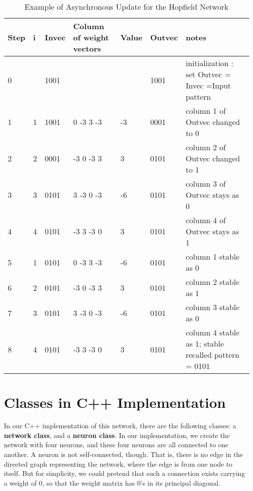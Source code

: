 \begin{center}
\begin{table}
\caption{Example of Asynchronous Update for the Hopfield Network}
\label{tab:example_of_asynchronous_update_for_the_hopfield_network}
\begin{tabular}{|l|l|l|p{3cm}|l|l|p{3cm}|}
\hline
Step & i & Invec & Column of weight vectors & Value & Outvec & notes \\
\hline
0    &   & 1001  &                          &       & 1001   & initialization : set Outvec = Invec =Input pattern\\
\hline
1    & 1 & 1001  & 0 -3 3 -3                & -3    & 0001   & column 1 of Outvec
changed to 0\\
\hline
2    & 2 & 0001  & -3 0 -3 3                &  3    & 0101   & column 2 of Outvec
changed to 1\\
\hline
3    & 3 & 0101  & 3 -3 0 -3                & -6    & 0101   & column 3 of Outvec
stays as 0\\
\hline
4    & 4 & 0101  & -3 3 -3 0                &  3    & 0101   & column 4 of Outvec
stays as 1\\
\hline
5    & 1 & 0101  & 0 -3 3 -3                & -6    & 0101   & column 1 stable as 0\\
\hline
6    & 2 & 0101  & -3 0 -3 3                &  3    & 0101   & column 2 stable as 1\\
\hline
7    & 3 & 0101  & 3 -3 0 -3                & -6    & 0101   & column 3 stable as 0\\
\hline
8    & 4 & 0101  & -3 3 -3 0                &  3    & 0101   & column 4 stable as
1; stable recalled pattern = 0101\\
\hline
\end{tabular}
\end{table}
\end{center}

\section{Classes in C++ Implementation}
In our C++ implementation of this network, there are the following classes: a
\textbf{network class}, and a \textbf{neuron class}. In our implementation, we create the
network with four neurons, and these four neurons are all connected to one
another. A neuron is not self-connected, though. That is, there is no edge in the
directed graph representing the network, where the edge is from one node to
itself. But for simplicity, we could pretend that such a connection exists
carrying a weight of 0, so that the weight matrix has 0’s in its principal
diagonal.

